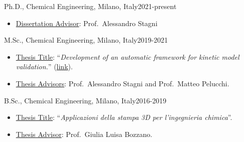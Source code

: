 \begin{position}{Ph.D., Chemical Engineering}{\polimi, Milano, Italy}{2021-present}
    \begin{itemize}
        \item[ ] \ul{Dissertation Advisor}: Prof.\ Alessandro Stagni
    \end{itemize}
\end{position}

\begin{position}{M.Sc., Chemical Engineering}{\polimi, Milano, Italy}{2019-2021}
    \begin{itemize}
        \item[ ] \ul{Thesis Title}: ``{\it Development of an automatic framework for kinetic
              model validation.}'' (\href{https://hdl.handle.net/10589/179004}{link}).
        \item[ ] \ul{Thesis Advisors}: Prof.\ Alessandro Stagni and Prof.\ Matteo Pelucchi.
    \end{itemize}
\end{position}

\begin{position}{B.Sc., Chemical Engineering}{\polimi, Milano, Italy}{2016-2019}
    \begin{itemize}
        \item[ ] \ul{Thesis Title}: ``{\it Applicazioni della stampa 3D per l'ingegnieria chimica}''.
        \item[ ] \ul{Thesis Advisor}: Prof.\ Giulia Luisa Bozzano.
    \end{itemize}
\end{position}


